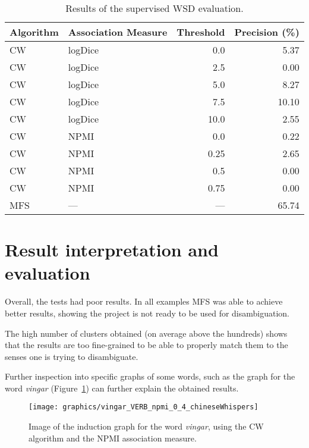 \begin{table}[ht]
\caption{Results of the supervised \ac*{WSD} evaluation.}
\label{tab:sup-results}
\begin{tabu} to \textwidth {Xlrr}
\hline
\textbf{Algorithm} & \textbf{Association Measure} & \textbf{Threshold} & \textbf{Precision (\%)} \\
\hline
\ac{CW} & logDice   &  0.0 &  5.37 \\
\ac{CW} & logDice   &  2.5 &  0.00 \\
\ac{CW} & logDice   &  5.0 &  8.27 \\
\ac{CW} & logDice   &  7.5 & 10.10 \\
\ac{CW} & logDice   & 10.0 &  2.55 \\
\hline
\ac{CW} & \ac{NPMI} & 0.0  &  0.22 \\
\ac{CW} & \ac{NPMI} & 0.25 &  2.65 \\
\ac{CW} & \ac{NPMI} & 0.5  &  0.00 \\
\ac{CW} & \ac{NPMI} & 0.75 &  0.00 \\
\hline
\ac{MFS} & ---      &  --- & 65.74 \\
\hline
\end{tabu}
\end{table}

\section{Result interpretation and evaluation}

Overall, the tests had poor results. In all examples \ac{MFS} was able to
achieve better results, showing the project is not ready to be used for
disambiguation.

The high number of clusters obtained (on average above the hundreds) shows that
the results are too fine-grained to be able to properly match them to the 
senses one is trying to disambiguate.

Further inspection into specific graphs of some words, such as the graph for the
word \emph{vingar} (Figure~\ref{fig:vingar_graph}) can further explain the
obtained results.

\begin{figure}[ht]
  \caption{Image of the induction graph for the word \emph{vingar}, using the
    \ac*{CW} algorithm and the \ac*{NPMI} association measure.}
  \label{fig:vingar_graph}
  \centering
  \texttt{[image: graphics/vingar\_VERB\_npmi\_0\_4\_chineseWhispers]}
\end{figure}

